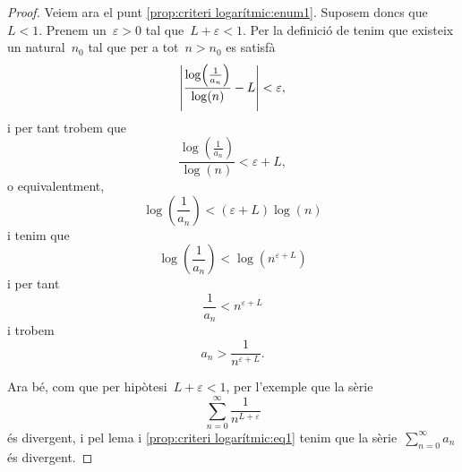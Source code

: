 \documentclass[../../main.tex]{subfiles}
\begin{document}
\begin{proposition}
\begin{proof}
            Veiem ara el punt \eqref{prop:criteri logarítmic:enum1}.
            Suposem doncs que~\(L<1\).
            Prenem un~\(\varepsilon>0\) tal que~\(L+\varepsilon<1\).
            Per la definició de  tenim que existeix un natural~\(n_{0}\) tal que per a tot~\(n>n_{0}\) es satisfà
            \[
                \abs{\frac{\log\left(\frac{1}{a_{n}}\right)}{\log(n)}-L}<\varepsilon,
            \]
            i per tant trobem que
            \[
                \frac{\log\left(\frac{1}{a_{n}}\right)}{\log(n)}<\varepsilon+L,
            \]
            o equivalentment,
            \[
                \log\left(\frac{1}{a_{n}}\right)<(\varepsilon+L)\log(n)
            \]
            i tenim que
            \[
                \log\left(\frac{1}{a_{n}}\right)<\log\left(n^{\varepsilon+L}\right)
            \]
            i per tant
            \[
                \frac{1}{a_{n}}<n^{\varepsilon+L}
            \]
            i trobem
            \begin{equation}
                \label{prop:criteri logarítmic:eq1}
                a_{n}>\frac{1}{n^{\varepsilon+L}}.
            \end{equation}

            Ara bé, com que per hipòtesi~\(L+\varepsilon<1\), per l'exemple  que la sèrie
            \[
                \sum_{n=0}^{\infty}\frac{1}{n^{L+\varepsilon}}
            \]
            és divergent, i pel lema  i \eqref{prop:criteri logarítmic:eq1} tenim que la sèrie~\(\sum_{n=0}^{\infty}a_{n}\) és divergent.
        \end{proof}
    \end{proposition}
\end{document}
